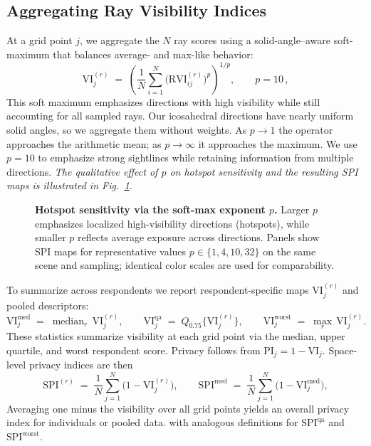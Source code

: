 \documentclass[final,3p,times,review]{elsarticle}
\begin{document}
\subsection{Aggregating Ray Visibility Indices}
\label{sec:aggregation}
At a grid point $j$, we aggregate the $N$ ray scores using a solid-angle–aware soft-maximum that balances average- and max-like behavior:
\begin{equation}
\mathrm{VI}_j^{(r)} \;=\; \left(\frac{1}{N} \sum_{i=1}^{N} \big(\mathrm{RVI}^{(r)}_{ij}\big)^{p} \right)^{\!1/p}, \qquad p=10\,,
\label{eq:softmax}
\end{equation}
This soft maximum emphasizes directions with high visibility while still accounting for all sampled rays. Our icosahedral directions have nearly uniform solid angles, so we aggregate them without weights. As $p\!\to\!1$ the operator approaches the arithmetic mean; as $p\!\to\!\infty$ it approaches the maximum. We use $p{=}10$ to emphasize strong sightlines while retaining information from multiple directions.
\textit{The qualitative effect of $p$ on hotspot sensitivity and the resulting SPI maps is illustrated in Fig.~\ref{fig:softmax}.}

\begin{figure}[t]
  \centering
  \caption{\textbf{Hotspot sensitivity via the soft-max exponent $p$.} Larger $p$ emphasizes localized high-visibility directions (hotspots), while smaller $p$ reflects average exposure across directions. Panels show SPI maps for representative values $p\in\{1,4,10,32\}$ on the same scene and sampling; identical color scales are used for comparability.}
  \label{fig:softmax}
\end{figure}

To summarize across respondents we report respondent-specific maps $\mathrm{VI}_j^{(r)}$ and pooled descriptors:
\begin{equation}
\mathrm{VI}_j^{\mathrm{med}} \;=\; \operatorname{median}_{r}\,\mathrm{VI}_j^{(r)},\qquad
\mathrm{VI}_j^{\mathrm{qa}} \;=\; Q_{0.75}\{\mathrm{VI}_j^{(r)}\},\qquad
\mathrm{VI}_j^{\mathrm{worst}} \;=\; \max_{r}\,\mathrm{VI}_j^{(r)}.
\label{eq:acrossrespondents}
\end{equation}
These statistics summarize visibility at each grid point via the median, upper quartile, and worst respondent score.
Privacy follows from $\mathrm{PI}_j = 1 - \mathrm{VI}_j$. Space-level privacy indices are then
\begin{equation}
\mathrm{SPI}^{(r)} \;=\; \frac{1}{N}\sum_{j=1}^{N}\!\big(1-\mathrm{VI}_j^{(r)}\big),\qquad
\mathrm{SPI}^{\mathrm{med}} \;=\; \frac{1}{N}\sum_{j=1}^{N}\!\big(1-\mathrm{VI}_j^{\mathrm{med}}\big),
\label{eq:spi_respondent_pooled}
\end{equation}
Averaging one minus the visibility over all grid points yields an overall privacy index for individuals or pooled data.
with analogous definitions for $\mathrm{SPI}^{\mathrm{qa}}$ and $\mathrm{SPI}^{\mathrm{worst}}$.
\end{document}
